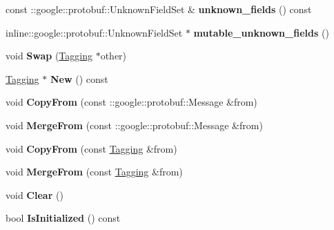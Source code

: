 \begin{DoxyCompactItemize}
\item 
\hypertarget{classTagging_a1d1cc0a22c9a9f084b64f5fb6545390b}{
const ::google::protobuf::UnknownFieldSet \& {\bfseries unknown\_\-fields} () const }
\label{classTagging_a1d1cc0a22c9a9f084b64f5fb6545390b}

\item 
\hypertarget{classTagging_a91d117de804c4646ab9ea9d3103d40d9}{
inline::google::protobuf::UnknownFieldSet $\ast$ {\bfseries mutable\_\-unknown\_\-fields} ()}
\label{classTagging_a91d117de804c4646ab9ea9d3103d40d9}

\item 
\hypertarget{classTagging_a6b6767148366f94de9462d02171d19d0}{
void {\bfseries Swap} (\hyperlink{classTagging}{Tagging} $\ast$other)}
\label{classTagging_a6b6767148366f94de9462d02171d19d0}

\item 
\hypertarget{classTagging_ad46be5a72376294a63988a2662dc74b3}{
\hyperlink{classTagging}{Tagging} $\ast$ {\bfseries New} () const }
\label{classTagging_ad46be5a72376294a63988a2662dc74b3}

\item 
\hypertarget{classTagging_a337681fda513929c00d203798c04ad52}{
void {\bfseries CopyFrom} (const ::google::protobuf::Message \&from)}
\label{classTagging_a337681fda513929c00d203798c04ad52}

\item 
\hypertarget{classTagging_acaf751b83c2458013c2d12c4bdaea619}{
void {\bfseries MergeFrom} (const ::google::protobuf::Message \&from)}
\label{classTagging_acaf751b83c2458013c2d12c4bdaea619}

\item 
\hypertarget{classTagging_ab2271da80aa840cfa9b2de493b3eeb1f}{
void {\bfseries CopyFrom} (const \hyperlink{classTagging}{Tagging} \&from)}
\label{classTagging_ab2271da80aa840cfa9b2de493b3eeb1f}

\item 
\hypertarget{classTagging_a13d8b75c40ac5f295bc61a2f3f94c3b0}{
void {\bfseries MergeFrom} (const \hyperlink{classTagging}{Tagging} \&from)}
\label{classTagging_a13d8b75c40ac5f295bc61a2f3f94c3b0}

\item 
\hypertarget{classTagging_a43f8e265b50703f56a295083d3aa9676}{
void {\bfseries Clear} ()}
\label{classTagging_a43f8e265b50703f56a295083d3aa9676}

\item 
\hypertarget{classTagging_ab5617848ff03416f1ab4d98e2bfdef26}{
bool {\bfseries IsInitialized} () const }
\label{classTagging_ab5617848ff03416f1ab4d98e2bfdef26}


\end{DoxyCompactItemize}
